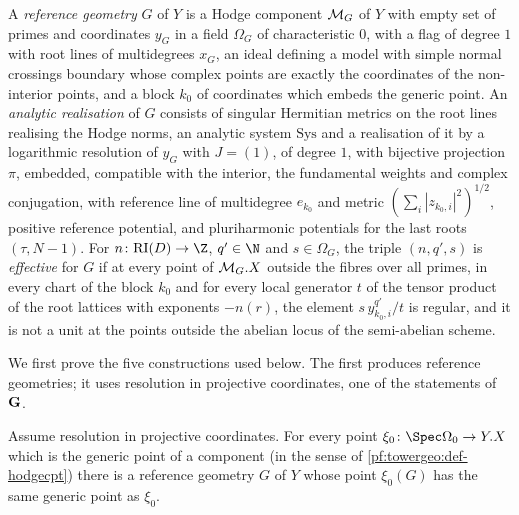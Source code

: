 A \emph{reference geometry} $G$ of $Y$ is a Hodge component $\mathcal M_G$ of $Y$ with empty set of primes
and coordinates $y_G$ in a field $\Omega_G$ of characteristic $0$, with a flag of degree $1$ with root lines
of multidegrees $x_G$, an ideal defining a model with simple normal crossings boundary whose complex points
are exactly the coordinates of the non-interior points, and a block $k_0$ of coordinates which embeds the
generic point. An \emph{analytic realisation} of $G$ consists of singular Hermitian metrics on the root
lines realising the Hodge norms, an analytic system $\mathrm{Sys}$ and a realisation of it by a logarithmic
resolution of $y_G$ with $J=(1)$, of degree $1$, with bijective projection $\pi$, embedded, compatible with
the interior, the fundamental weights and complex conjugation, with reference line of multidegree $e_{k_0}$
and metric $(\sum_i|z_{k_0,i}|^2)^{1/2}$, positive reference potential, and pluriharmonic potentials for the
last roots $(\tau,N-1)$. For $n\colon\towergeoRI(D)\to\Z$, $q'\in\N$ and $s\in\Omega_G$, the triple
$(n,q',s)$ is \emph{effective} for $G$ if at every point of $\mathcal M_G.X$ outside the fibres over all
primes, in every chart of the block $k_0$ and for every local generator $t$ of the tensor product of the
root lattices with exponents $-n(r)$, the element $s\,y_{k_0,i}^{q'}/t$ is regular, and it is not a unit at
the points outside the abelian locus of the semi-abelian scheme.

We first prove the five constructions used below. The first produces reference geometries; it uses
resolution in projective coordinates, one of the statements of $\mathbf G$.

\begin{proposition}\label{pf:towergeo:refgeo}
Assume resolution in projective coordinates. For every point $\xi_0\colon\Spec\Omega_0\to Y.X$ which is the
generic point of a component (in the sense of \cref{pf:towergeo:def-hodgecpt}) there is a reference geometry
$G$ of $Y$ whose point $\xi_0(G)$ has the same generic point as $\xi_0$.
\end{proposition}


